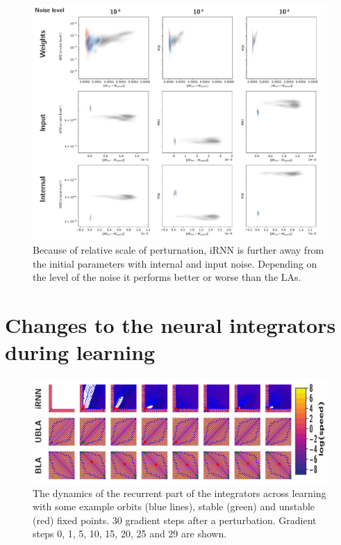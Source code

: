 \documentclass{article} %
\newcounter{ct}
\theoremstyle{definition}
\theoremstyle{remark}
\begin{document}
\begin{figure}[H]
     \centering
    \includegraphics[width=\textwidth]{allnoise_contours}
       \caption{Because of relative scale of perturnation, iRNN is further away from the initial parameters with internal and input noise.
        Depending on the level of the noise it performs better or worse than the LAs.}
         \label{fig:interal_input_contours}
\end{figure}



\section{Changes to the neural integrators during learning}\label{sec:supp:learning}

\begin{figure}[H]
     \centering
    \includegraphics[width=\textwidth]{vfs_f100_gs1_optlrs}
       \caption{The dynamics of the recurrent part of the integrators across learning with some example orbits (blue lines), stable (green) and unstable (red) fixed points. 30 gradient steps after a perturbation. Gradient steps 0, 1, 5, 10, 15, 20, 25 and 29 are shown. }
         \label{fig:vfs1}
\end{figure}
\end{document}
